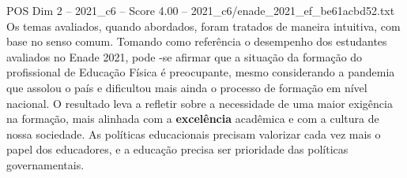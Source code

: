 \begin{textsample}{POS Dim 2 – 2021\_c6 – Score 4.00 – 2021\_c6/enade\_2021\_ef\_be61acbd52.txt}
Os temas avaliados, quando abordados, foram tratados de maneira intuitiva, com base no senso comum.
Tomando como referência o desempenho dos estudantes avaliados no Enade 2021, pode -se afirmar que a situação da formação do profissional de Educação Física é preocupante, mesmo considerando a pandemia que assolou o país e dificultou mais ainda o processo de formação em nível nacional.
O resultado leva a refletir sobre a necessidade de uma maior exigência na formação, mais alinhada com a \textbf{excelência} acadêmica e com a cultura de nossa sociedade.
As políticas educacionais precisam valorizar cada vez mais o papel dos educadores, e a educação precisa ser prioridade das políticas governamentais.

\end{textsample}
